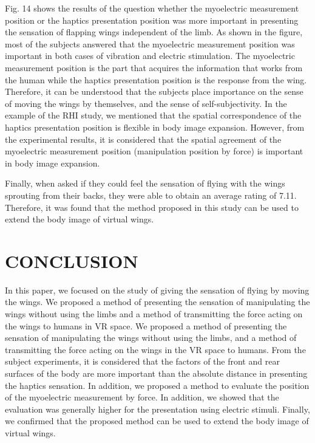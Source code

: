 \documentclass[letterpaper, 10 pt, conference]{ieeeconf}  %
\begin{document}
                Fig. 14 shows the results of the question whether the myoelectric measurement position or the haptics presentation position was more important in presenting the sensation of flapping wings independent of the limb. 
                As shown in the figure, most of the subjects answered that the myoelectric measurement position was important in both cases of vibration and electric stimulation.
                The myoelectric measurement position is the part that acquires the information that works from the human while the haptics presentation position is the response from the wing.
                Therefore, it can be understood that the subjects place importance on the sense of moving the wings by themselves, and the sense of self-subjectivity.
                In the example of the RHI study, we mentioned that the spatial correspondence of the haptics presentation position is flexible in body image expansion. However, from the experimental results, it is considered that the spatial agreement of the myoelectric measurement position (manipulation position by force) is important in body image expansion.

                Finally, when asked if they could feel the sensation of flying with the wings sprouting from their backs, they were able to obtain an average rating of 7.11. 
                Therefore, it was found that the method proposed in this study can be used to extend the body image of virtual wings.


\section{CONCLUSION}
        In this paper, we focused on the study of giving the sensation of flying by moving the wings. 
        We proposed a method of presenting the sensation of manipulating the wings without using the limbs and a method of transmitting the force acting on the wings to humans in VR space. 
        We proposed a method of presenting the sensation of manipulating the wings without using the limbs, and a method of transmitting the force acting on the wings in the VR space to humans. 
        From the subject experiments, it is considered that the factors of the front and rear surfaces of the body are more important than the absolute distance in presenting the haptics sensation. 
        In addition, we proposed a method to evaluate the position of the myoelectric measurement by force. 
        In addition, we showed that the evaluation was generally higher for the presentation using electric stimuli. 
        Finally, we confirmed that the proposed method can be used to extend the body image of virtual wings.
    
\end{document}

